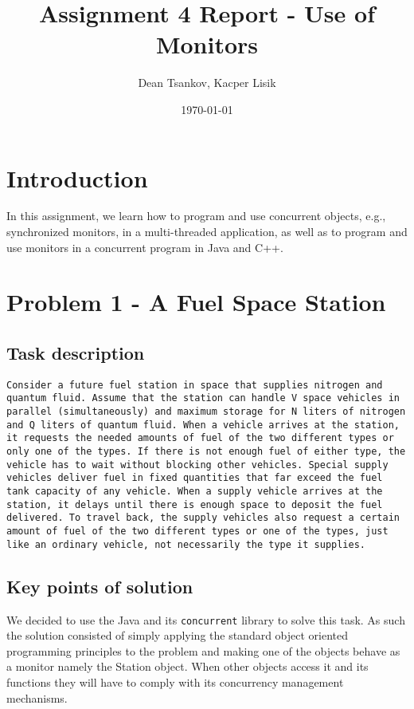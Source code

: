 \documentclass[a4paper,11pt]{article}
\begin{document}
\title{
    \textbf{Assignment 4 Report - Use of Monitors}
}
\author{Dean Tsankov, Kacper Lisik}
\date{\today}

\maketitle

\section*{Introduction}

In this assignment, we learn how to program and use concurrent objects, e.g., synchronized monitors, in a multi-threaded application, as well as to program and use monitors in a concurrent program in Java and C++.

\section*{Problem 1 - A Fuel Space Station}

\subsection*{Task description}

\begin{verbatim}
Consider a future fuel station in space that supplies nitrogen and quantum fluid. Assume that the station can handle V space vehicles in parallel (simultaneously) and maximum storage for N liters of nitrogen and Q liters of quantum fluid. When a vehicle arrives at the station, it requests the needed amounts of fuel of the two different types or only one of the types. If there is not enough fuel of either type, the vehicle has to wait without blocking other vehicles. Special supply vehicles deliver fuel in fixed quantities that far exceed the fuel tank capacity of any vehicle. When a supply vehicle arrives at the station, it delays until there is enough space to deposit the fuel delivered. To travel back, the supply vehicles also request a certain amount of fuel of the two different types or one of the types, just like an ordinary vehicle, not necessarily the type it supplies.

\end{verbatim}


\subsection*{Key points of solution}
We decided to use the Java and its {\tt concurrent} library to solve this task. As such the solution consisted of simply applying the standard object oriented programming principles to the problem and making one of the objects behave as a monitor namely the Station object. When other objects access it and its functions they will have to comply with its concurrency management mechanisms.
\\
\end{document}
